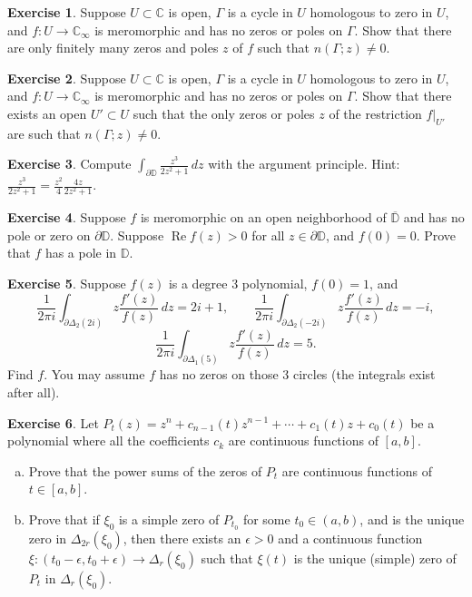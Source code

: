 \documentclass[12pt,openany]{book}
\renewcommand{\Re}{\operatorname{Re}}
\newcommand{\C}{{\mathbb{C}}}
\newcommand{\D}{{\mathbb{D}}}
\theoremstyle{plain}
\theoremstyle{remark}
\theoremstyle{definition}
\newenvironment{exbox}{%
    \def\FrameCommand{\vrule width 1pt \relax\hspace{10pt}}%
    \MakeFramed{\advance\hsize-\width\FrameRestore}%
}{%
    \endMakeFramed
}
\newenvironment{exparts}{%
    \leavevmode\begin{enumerate}[a),noitemsep,topsep=0pt,parsep=0pt,partopsep=0pt]
}{%
    \end{enumerate}
}
\theoremstyle{exercise}
\newtheorem{exercise}{Exercise}[section]
\theoremstyle{example}
\begin{document}
\begin{exbox}
\begin{exercise}
Suppose $U \subset \C$ is open, $\Gamma$ is a cycle in $U$
homologous to zero in $U$,
and $f \colon U \to \C_\infty$ is meromorphic and
has no zeros or poles on $\Gamma$.
Show that there are only finitely many zeros and poles $z$ of $f$
such that $n(\Gamma;z) \not= 0$.
\end{exercise}

\begin{exercise}
Suppose $U \subset \C$ is open, $\Gamma$ is a cycle in $U$
homologous to zero in $U$,
and $f \colon U \to \C_\infty$ is meromorphic and
has no zeros or poles on $\Gamma$.
Show that there exists an open $U' \subset U$ such that
the only zeros or poles $z$ of the restriction $f|_{U'}$
are such that $n(\Gamma;z) \not= 0$.
\end{exercise}

\begin{exercise}
Compute $\int_{\partial \D} \frac{z^3}{2 z^2+1} \, dz$ with the argument
principle.  Hint: $\frac{z^3}{2 z^2+1}=\frac{z^2}{4} \frac{4z}{2z^2+1}$.
\end{exercise}

\begin{exercise}
Suppose $f$ is meromorphic on an open neighborhood of $\overline{\D}$
and has no pole or zero on $\partial \D$.  Suppose $\Re f(z) >
0$ for all $z \in \partial \D$, and $f(0) = 0$.  Prove that $f$ has a pole
in $\D$.
\end{exercise}

\begin{exercise}
Suppose $f(z)$ is a degree 3 polynomial, $f(0)=1$, and
\begin{equation*}
\frac{1}{2\pi i}
\int_{\partial \Delta_2(2i)} z \frac{f'(z)}{f(z)} \, dz = 2i+1 ,
\qquad
\frac{1}{2\pi i}
\int_{\partial \Delta_2(-2i)} z \frac{f'(z)}{f(z)} \, dz = -i ,
\end{equation*}
\begin{equation*}
\frac{1}{2\pi i}
\int_{\partial \Delta_1(5)} z \frac{f'(z)}{f(z)} \, dz = 5 .
\end{equation*}
Find $f$.  You may assume $f$ has no zeros on those 3 circles (the
integrals exist after all).
\end{exercise}

\begin{exercise}
Let $P_t(z) = z^n + c_{n-1}(t) z^{n-1} + \cdots + c_1(t) z + c_0(t)$
be a polynomial where all the coefficients $c_k$ are continuous functions
of $[a,b]$.
\begin{exparts}
\item
Prove that the power sums of the zeros of $P_t$ are
continuous functions of $t \in [a,b]$.
\item
Prove that if $\xi_0$ is a simple zero of $P_{t_0}$ for some $t_0 \in (a,b)$,
and is the unique zero in
$\Delta_{2r}(\xi_0)$, then
there exists an $\epsilon > 0$ and a continuous function $\xi \colon
(t_0-\epsilon,t_0+\epsilon) \to \Delta_r(\xi_0)$ such that $\xi(t)$
is the unique (simple) zero of $P_t$ in $\Delta_r(\xi_0)$.
\end{exparts}
\end{exercise}


\end{exbox}
\end{document}
